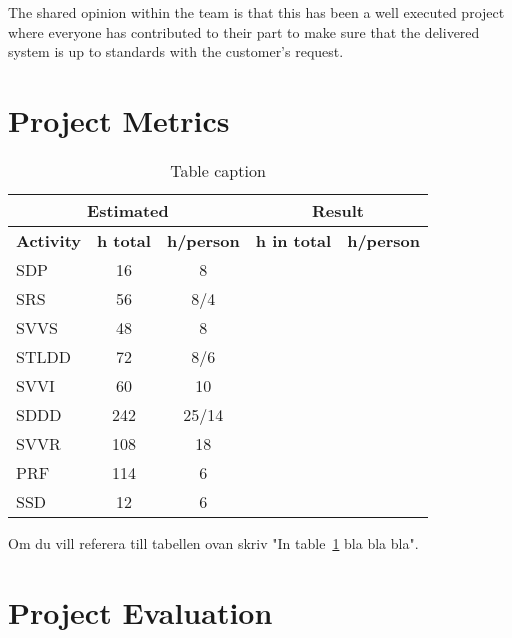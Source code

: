 \documentclass[a4paper]{article}
\begin{document}
The shared opinion within the team is that this has been a well executed project where everyone has contributed to their part to make sure that the delivered system is up to standards with the customer's request.  

\section{Project Metrics}
\label{sec:metr}



\begin{table}[h!]
\centering
\caption{Table caption}
\begin{tabular}{|l|c|c||c|c|}
 \hline
\multicolumn{3}{|c||}{\textbf{Estimated}} & \multicolumn{2}{|c|}{\textbf{Result}}\\ \hline \hline
\textbf{Activity} & \textbf{h total} & \textbf{h/person} & \textbf{h in total} & \textbf{h/person} \\ \hline
SDP & 16 & 8 & & \\ \hline
SRS & 56 & 8/4 & & \\ \hline
SVVS & 48 & 8 & & \\ \hline
STLDD & 72 & 8/6 & & \\ \hline
SVVI & 60 & 10 & & \\ \hline 
SDDD & 242 & 25/14 & & \\ \hline
SVVR & 108 & 18 & & \\ \hline
PRF & 114 & 6 & & \\ \hline
SSD & 12 & 6 & & \\ \hline

\end{tabular}
\label{table:time}
\end{table}

Om du vill referera till tabellen ovan skriv "In table~\ref{table:time} bla bla bla".

\FloatBarrier
\section{Project Evaluation}
\end{document}
